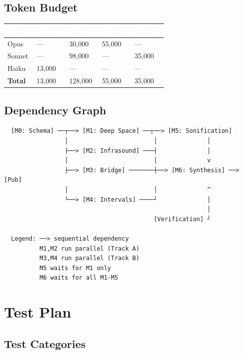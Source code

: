 \documentclass[11pt,letterpaper]{article}
\newcommand{\tableheader}[1]{\textbf{\sffamily\textcolor{white}{#1}}}
\begin{document}
\subsection{Token Budget}

\begin{center}
\begin{tabularx}{\textwidth}{L{4cm}C{2cm}C{2cm}C{2cm}C{2cm}}
\toprule
{}
\tableheader{Model} & \tableheader{Wave 0} & \tableheader{Wave 1} & \tableheader{Wave 2} & \tableheader{Wave 3} \\
\midrule
Opus & --- & 30,000 & 55,000 & --- \\
Sonnet & --- & 98,000 & --- & 35,000 \\
Haiku & 13,000 & --- & --- & --- \\
\midrule
\textbf{Total} & 13,000 & 128,000 & 55,000 & 35,000 \\
\bottomrule
\end{tabularx}
\end{center}

\subsection{Dependency Graph}

\begin{asciibox}
\begin{verbatim}
  [M0: Schema] ──┬──> [M1: Deep Space] ──┬──> [M5: Sonification]
                 │                        │              │
                 ├──> [M2: Infrasound] ───┤              │
                 │                        │              v
                 ├──> [M3: Bridge] ───────┼──> [M6: Synthesis] ──> [Pub]
                 │                        │              ^
                 └──> [M4: Intervals] ────┘              │
                                                         │
                                          [Verification] ┘

  Legend: ──> sequential dependency
          M1,M2 run parallel (Track A)
          M3,M4 run parallel (Track B)
          M5 waits for M1 only
          M6 waits for all M1-M5
\end{verbatim}
\end{asciibox}

\section{Test Plan}

\subsection{Test Categories}
\end{document}
